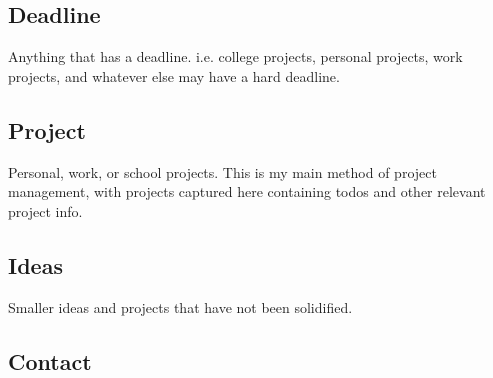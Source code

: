 \documentclass[11pt]{article}
\begin{document}
\subsection{Deadline}
\label{sec:orgb0070d9}
Anything that has a deadline. i.e. college projects, personal projects, work projects, and whatever else may have a hard deadline.
\subsection{Project}
\label{sec:orgf21e824}
Personal, work, or school projects. This is my main method of project management, with projects captured here containing todos and other relevant project info.
\subsection{Ideas}
\label{sec:orgc264ef4}
Smaller ideas and projects that have not been solidified.
\subsection{Contact}
\label{sec:orgdc8a062}
\end{document}
